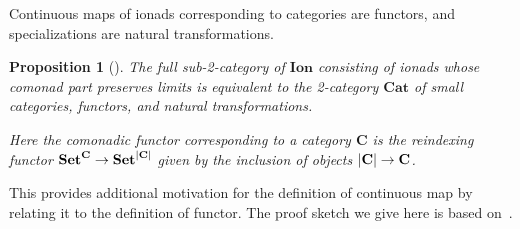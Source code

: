 \documentclass[11pt, oneside, article]{memoir}
\theoremstyle{plain}
\newtheorem{proposition}[theorem]{Proposition}
\theoremstyle{definition}
\theoremstyle{remark}
\DeclarePairedDelimiter{\abs}{\lvert}{\rvert}
\newcommand{\namedcat}[1]{\mathbf{#1}}
\newcommand{\cat}[1]{\mathbf{#1}}
\newcommand{\Set}{\namedcat{Set}}
\newcommand{\Cat}{\namedcat{Cat}}
\newcommand{\pts}[1]{{\abs{#1}}}
\newcommand{\obs}[1]{\pts{#1}}
\newcommand{\fun}[2]{{#2}^{#1}}
\newcommand{\Ionad}{\namedcat{Ion}}
\newcommand{\bC}{\cat{C}}
\begin{document}
Continuous maps of ionads corresponding to categories are functors,
and specializations are natural transformations.

\begin{proposition}[{\cite[Example 4.4]{garner:ionads}}]\label{lem:categories}\label{prop:cationad}
  The full sub-2-category of $\Ionad$ consisting of ionads whose
  comonad part preserves limits is equivalent to the 2-category $\Cat$
  of small categories, functors, and natural transformations.
  
  Here the comonadic functor corresponding to a category $\bC$ is the
  reindexing functor $\fun{\bC}{\Set} \to \Set^{\obs{\bC}}$ given by
  the inclusion of objects $\pts{\bC} \to \bC$.
\end{proposition}

This provides additional motivation for the definition of continuous
map by relating it to the definition of functor. The proof sketch we
give here is based on~\cite{trimble:functor}.
\end{document}
